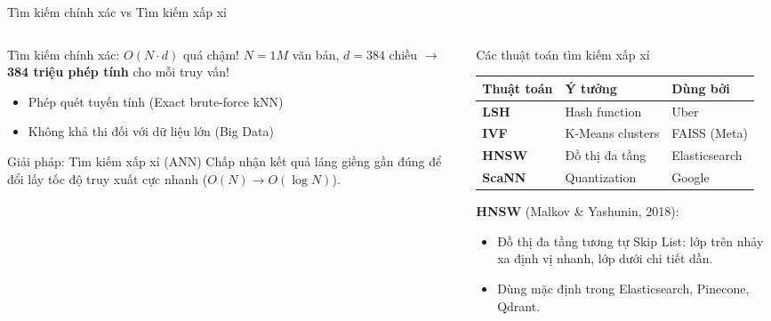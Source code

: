 \documentclass[aspectratio=169, 11pt]{beamer}
\begin{document}
\begin{frame}{Tìm kiếm chính xác vs Tìm kiếm xấp xỉ}
\begin{columns}[T]
\begin{column}{0.48\textwidth}

\begin{alertblock}{Tìm kiếm chính xác: $O(N \cdot d)$ quá chậm!}
{\small $N{=}1M$ văn bản, $d{=}384$ chiều $\to$ \textbf{384 triệu phép tính} cho mỗi truy vấn!}
\begin{itemize}
    \item Phép quét tuyến tính (Exact brute-force kNN)
    \item Không khả thi đối với dữ liệu lớn (Big Data)
\end{itemize}
\end{alertblock}

\begin{block}{Giải pháp: Tìm kiếm xấp xỉ (ANN)}
{\small Chấp nhận kết quả láng giềng gần đúng để đổi lấy tốc độ truy xuất cực nhanh ($O(N) \to O(\log N)$).}
\end{block}

\end{column}
\begin{column}{0.48\textwidth}

\begin{block}{Các thuật toán tìm kiếm xấp xỉ}
\centering
\renewcommand{\arraystretch}{0.9}
{\small
\begin{tabular}{l l l}
\toprule
\textbf{Thuật toán} & \textbf{Ý tưởng} & \textbf{Dùng bởi} \\
\midrule
\textbf{LSH} & Hash function & Uber \\
\textbf{IVF} & K-Means clusters & FAISS (Meta) \\
\textbf{HNSW} & Đồ thị đa tầng & Elasticsearch \\
\textbf{ScaNN} & Quantization & Google \\
\bottomrule
\end{tabular}
}
\end{block}

\vspace{0.1cm}

\textbf{HNSW} {\small (Malkov \& Yashunin, 2018):}
\begin{itemize}
    \item {\small Đồ thị đa tầng tương tự Skip List: lớp trên nhảy xa định vị nhanh, lớp dưới chi tiết dần.}
    \item {\small Dùng mặc định trong Elasticsearch, Pinecone, Qdrant.}
\end{itemize}

\end{column}
\end{columns}
\end{frame}
\end{document}
